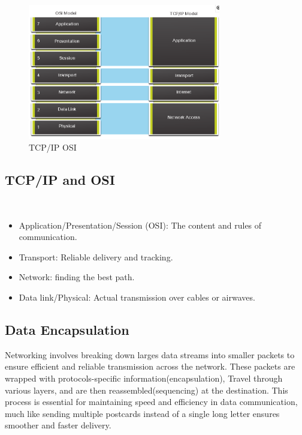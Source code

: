 \documentclass[a4paper,11pt]{article}
\begin{document}
\begin{figure}[h!]
    \centering
    \includegraphics[width=0.75\textwidth]{6.png}
    \caption{TCP/IP OSI}
    \label{fig:cap1}
\end{figure}

\subsection{TCP/IP and OSI}\\
\begin{itemize}
    \item Application/Presentation/Session (OSI): The content and rules of communication.\\
    \item Transport: Reliable delivery and tracking.\\
    \item Network: finding the best path.\\
    \item Data link/Physical: Actual transmission over cables or airwaves.\\
\end{itemize}

\subsection{Data Encapsulation}
Networking involves breaking down larges data streams into smaller packets to ensure efficient and reliable transmission across the network. These packets are wrapped with protocols-specific information(encapsulation), Travel through various layers, and are then reassembled(sequencing) at the destination. This process is essential for maintaining speed and efficiency in data communication, much like sending multiple postcards instead of a single long letter ensures smoother and faster delivery.\\
\end{document}
